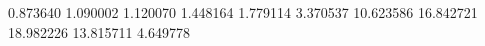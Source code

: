 0.873640
1.090002
1.120070
1.448164
1.779114
3.370537
10.623586
16.842721
18.982226
13.815711
4.649778

